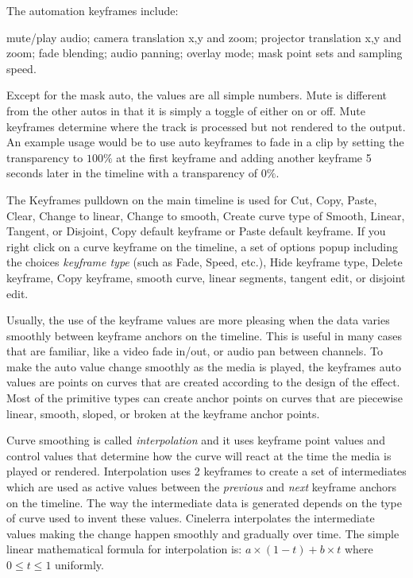 The automation keyframes include:

mute/play audio; camera translation x,y and zoom; projector translation x,y and zoom; fade blending; audio panning; overlay mode; mask point sets and sampling speed.

Except for the mask auto, the values are all simple numbers.  Mute is different from the other autos in that it is simply a toggle of either on or off.  Mute keyframes determine where the track is processed but not rendered to the output.  An example usage would be to use auto keyframes to fade in a clip by setting the transparency to $100\%$ at the first keyframe and adding another keyframe 5 seconds later in the timeline with a transparency of $0\%$.  

The Keyframes pulldown on the main timeline is used for Cut, Copy, Paste, Clear, Change to linear, Change to smooth, Create curve type of Smooth, Linear, Tangent, or Disjoint, Copy default keyframe or Paste default keyframe.  If you right click on a curve keyframe on the timeline, a set of options popup including the choices \textit{keyframe type} (such as Fade, Speed, etc.), Hide keyframe type, Delete keyframe, Copy keyframe, smooth curve, linear segments, tangent edit, or disjoint edit.

Usually, the use of the keyframe values are more pleasing when the data varies smoothly between keyframe anchors on the timeline.  This is useful in many cases that are familiar, like a video fade in/out, or audio pan between channels.  To make the auto value change smoothly as the media is played, the keyframes auto values are points on curves that are created according to the design of the effect.  Most of the primitive types can create anchor points on curves that are piecewise linear, smooth, sloped, or broken at the keyframe anchor points.

Curve smoothing is called \textit{interpolation} and it uses keyframe point values and control values that determine how the curve will react at the time the media is played or rendered.  Interpolation uses 2 keyframes to create a set of intermediates which are used as active values between the \textit{previous} and \textit{next} keyframe anchors on the timeline.  The way the intermediate data is generated depends on the type of curve used to invent these values.  Cinelerra interpolates the intermediate values making the change happen smoothly and gradually over time.  The simple linear mathematical formula for interpolation is:   $a\times(1-t) + b\times t$    where $0\le t\le 1$ uniformly.

